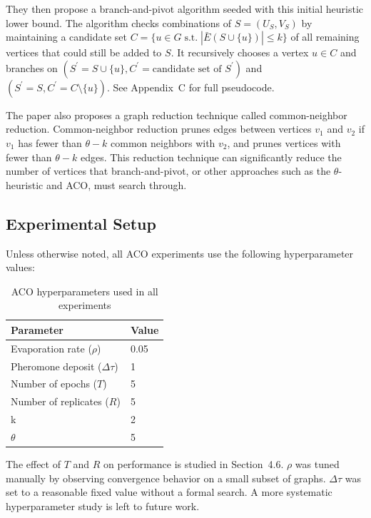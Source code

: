 \documentclass[conference]{IEEEtran}
\begin{document}
They then propose a branch-and-pivot algorithm seeded with this initial heuristic lower bound. The algorithm checks combinations of $S = (U_S, V_S)$ by maintaining a candidate set $C = \{u \in G \mathrel{\text{s.t.}} |\bar{E}(S \cup \{u\})| \leq k\}$ of all remaining vertices that could still be added to $S$. It recursively chooses a vertex $u \in C$ and branches on $(S^\prime = S \cup \{u\}, C^\prime = \text{candidate set of } S^\prime)$ and $(S^\prime = S, C^\prime = C \setminus \{u\})$. See Appendix~C for full pseudocode.


The paper also proposes a graph reduction technique called common-neighbor reduction. Common-neighbor reduction prunes edges between vertices $v_1$ and $v_2$ if $v_1$ has fewer than $\theta - k$ common neighbors with $v_2$, and prunes vertices with fewer than $\theta - k$ edges. This reduction technique can significantly reduce the number of vertices that branch-and-pivot, or other approaches such as the $\theta$-heuristic and ACO, must search through.


\FloatBarrier
\subsection{Experimental Setup}


Unless otherwise noted, all ACO experiments use the following hyperparameter values:


\begin{table}[H]
   \centering
   \caption{ACO hyperparameters used in all experiments}
   \begin{tabular}{ll}
       \toprule
       Parameter & Value \\
       \midrule
       Evaporation rate ($\rho$) & 0.05 \\
       Pheromone deposit ($\Delta\tau$) & 1 \\
       Number of epochs ($T$) & 5 \\
       Number of replicates ($R$) & 5 \\
       k & 2 \\
       $\theta$ & 5 \\
       \bottomrule
   \end{tabular}
\end{table}


The effect of $T$ and $R$ on performance is studied in Section~4.6. $\rho$ was tuned manually by observing convergence behavior on a small subset of graphs. $\Delta\tau$ was set to a reasonable fixed value without a formal search. A more systematic hyperparameter study is left to future work.
\end{document}

